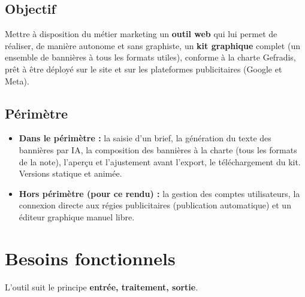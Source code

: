 \documentclass[11pt,a4paper]{article}
\begin{document}
\subsection{Objectif}
Mettre à disposition du métier marketing un \textbf{outil web} qui lui permet de
réaliser, de manière autonome et sans graphiste, un \textbf{kit graphique}
complet (un ensemble de bannières à tous les formats utiles), conforme à la
charte Gefradis, prêt à être déployé sur le site et sur les plateformes
publicitaires (Google et Meta).

\subsection{Périmètre}
\begin{itemize}[leftmargin=1.4em]
  \item \textbf{Dans le périmètre :} la saisie d'un brief, la génération du texte
        des bannières par IA, la composition des bannières à la charte (tous les
        formats de la note), l'aperçu et l'ajustement avant l'export, le
        téléchargement du kit. Versions statique et animée.
  \item \textbf{Hors périmètre (pour ce rendu) :} la gestion des comptes
        utilisateurs, la connexion directe aux régies publicitaires (publication
        automatique) et un éditeur graphique manuel libre.
\end{itemize}

\section{Besoins fonctionnels}
L'outil suit le principe \textbf{entrée, traitement, sortie}.
\end{document}
